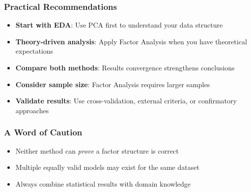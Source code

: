 \documentclass[aspectratio=169]{beamer}
\begin{document}
\begin{frame}[fragile]
    \frametitle{Practical Recommendations}
    \begin{itemize}
        \item \textbf{Start with EDA}: Use PCA first to understand your data structure \pause
        \item \textbf{Theory-driven analysis}: Apply Factor Analysis when you have theoretical expectations \pause
        \item \textbf{Compare both methods}: Results convergence strengthens conclusions \pause
        \item \textbf{Consider sample size}: Factor Analysis requires larger samples \pause
        \item \textbf{Validate results}: Use cross-validation, external criteria, or confirmatory approaches
    \end{itemize}
\end{frame}

\begin{frame}[fragile]
    \frametitle{A Word of Caution}
    \begin{itemize}
        \item Neither method can \textit{prove} a factor structure is correct \pause
        \item Multiple equally valid models may exist for the same dataset \pause
        \item Always combine statistical results with domain knowledge
    \end{itemize}
\end{frame}
\end{document}
